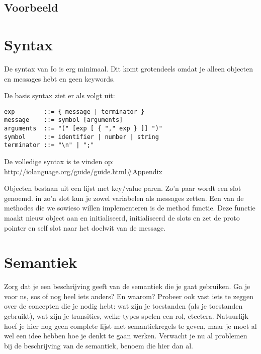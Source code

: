 \documentclass[12pt]{article}
\begin{document}
\subsection*{Voorbeeld}


\section{Syntax}
De syntax van Io is erg minimaal. Dit komt grotendeels omdat je alleen objecten en messages hebt en geen keywords.

De basis syntax ziet er als volgt uit:
\begin{lstlisting}
exp        ::= { message | terminator }
message    ::= symbol [arguments]
arguments  ::= "(" [exp [ { "," exp } ]] ")"
symbol     ::= identifier | number | string
terminator ::= "\n" | ";"
\end{lstlisting}

De volledige syntax is te vinden op: \url{http://iolanguage.org/guide/guide.html#Appendix}

Objecten bestaan uit een lijst met key/value paren. Zo'n paar wordt een slot genoemd.
in zo'n slot kun je zowel variabelen als messages zetten.
Een van de methodes die we sowieso willen implementeren is de method functie. 
Deze functie maakt nieuw object aan en initialiseerd, initialiseerd de slots en zet de proto pointer en self slot naar het doelwit van de message. 





\section{Semantiek}
Zorg dat je een beschrijving geeft van de semantiek die je gaat gebruiken. Ga je voor ns, sos of nog heel iets anders? En waarom? Probeer ook vast iets te zeggen over de concepten die je nodig hebt: wat zijn je toestanden (als je toestanden gebruikt), wat zijn je transities, welke types spelen een rol, etcetera. Natuurlijk hoef je hier nog geen complete lijst met semantiekregels te geven, maar je moet al wel een idee hebben hoe je denkt te gaan werken. Verwacht je nu al problemen bij de beschrijving van de semantiek, benoem die hier dan al.
\end{document}
